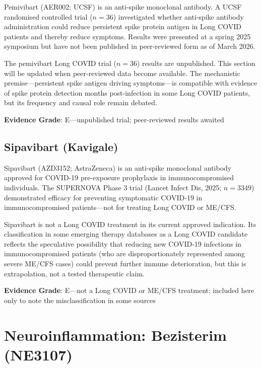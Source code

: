 Pemivibart (AER002; UCSF) is an anti-spike monoclonal antibody. A UCSF randomised controlled trial ($n=36$) investigated whether anti-spike antibody administration could reduce persistent spike protein antigen in Long COVID patients and thereby reduce symptoms. Results were presented at a spring 2025 symposium but have not been published in peer-reviewed form as of March 2026.

\begin{limitation}
The pemivibart Long COVID trial ($n=36$) results are unpublished. This section will be updated when peer-reviewed data become available. The mechanistic premise---persistent spike antigen driving symptoms---is compatible with evidence of spike protein detection months post-infection in some Long COVID patients, but its frequency and causal role remain debated.
\end{limitation}

\textbf{Evidence Grade}: E---unpublished trial; peer-reviewed results awaited

\subsection{Sipavibart (Kavigale)}
\label{subsec:sipavibart}

Sipavibart (AZD3152; AstraZeneca) is an anti-spike monoclonal antibody approved for COVID-19 pre-exposure prophylaxis in immunocompromised individuals. The SUPERNOVA Phase 3 trial (Lancet Infect Dis, 2025; $n=3349$) demonstrated efficacy for preventing symptomatic COVID-19 in immunocompromised patients---not for treating Long COVID or ME/CFS.

Sipavibart is not a Long COVID treatment in its current approved indication. Its classification in some emerging therapy databases as a Long COVID candidate reflects the speculative possibility that reducing new COVID-19 infections in immunocompromised patients (who are disproportionately represented among severe ME/CFS cases) could prevent further immune deterioration, but this is extrapolation, not a tested therapeutic claim.

\textbf{Evidence Grade}: E---not a Long COVID or ME/CFS treatment; included here only to note the misclassification in some sources

\section{Neuroinflammation: Bezisterim (NE3107)}
\label{sec:bezisterim}

